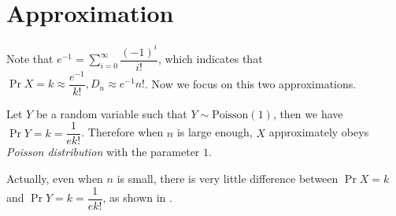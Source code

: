 
\section{Approximation}
Note that $ e^{-1} = \sum_{i=0}^{\infty}\dfrac{(-1)^i}{i!}$,
which indicates that $\Pr{X=k}\approx \dfrac{e^{-1}}{k!},D_n \approx e^{-1}n! $. Now we focus on this two approximations.

Let $ Y$ be a random variable such that $ Y\sim \text{Poisson}(1)$, then
we have $ \Pr{Y=k} = \dfrac{1}{ek!}$.
Therefore when $ n$ is large enough,
$ X$ approximately obeys \emph{Poisson distribution} with the parameter $ 1$.

Actually, even when $ n$ is small,
there is very little difference between $ \Pr{X=k}$ and $ \Pr{Y=k}=\dfrac{1}{ek!}$,
as shown in .

